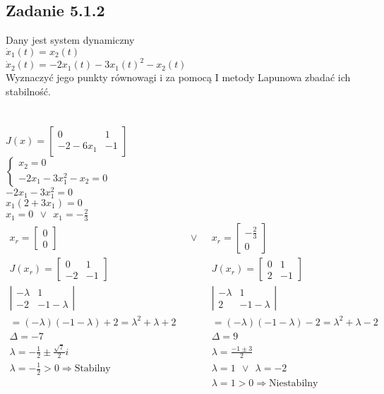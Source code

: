 \subsection*{Zadanie 5.1.2} {\color{darkgray}
	Dany jest system dynamiczny\\
	$\dot{x}_1(t)=x_2(t)$\\
	$\dot{x}_2(t)=-2x_1(t)-3x_1(t)^2-x_2(t)$\\
	Wyznaczyć jego punkty równowagi i za pomocą I metody Lapunowa zbadać ich stabilność.\\
}\lineh
\\\\
$J(x)=\left[ \begin{array}{cc}  0&1\\-2-6x_1 & -1   \end{array}\right]$\\
$\begin{cases}x_2=0\\-2x_1-3x_1^2-x_2=0\end{cases}$\\
$-2x_1-3x_1^2=0$\\
$x_1(2+3x_1)=0$\\
$x_1=0\ \  \vee \ \ x_1=-\frac23$\\
$\begin{array}{lll}
x_r= \left[ \begin{array}{c}   0\\0    \end{array}\right] &\ \ \ \vee \ \ \ & x_r= \left[ \begin{array}{c}   -\frac 23\\0    \end{array}\right] \\
J(x_r)=\left[ \begin{array}{cc}  0&1\\-2&-1    \end{array}\right] && J(x_r)=\left[ \begin{array}{cc}   0&1\\2&-1    \end{array}\right]\\
\left| \begin{array}{cc}  -\lambda & 1 \\-2&-1-\lambda    \end{array}\right|&&\left| \begin{array}{cc}  -\lambda & 1 \\2&-1-\lambda    \end{array}\right|\\
=(-\lambda)(-1-\lambda)+2=\lambda^2+\lambda+2&&=(-\lambda)(-1-\lambda)-2=\lambda^2+\lambda-2\\
\Delta=-7&&\Delta=9\\
\lambda=-\frac 12 \pm \frac{\sqrt 7}{2}i&&\lambda=\frac{-1 \pm 3}{2}\\
\lambda = -\frac 12 >0 \Rightarrow \text{Stabilny} && \lambda = 1 \ \ \vee \ \ \lambda=-2\\
 && \lambda = 1 >0 \Rightarrow \text{Niestabilny}
\end{array}$\\


